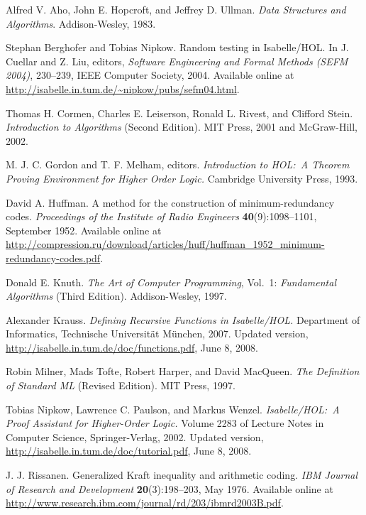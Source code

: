 \documentclass[11pt,a4paper]{article}
\begin{document}
\begin{thebibliography}{[9]}

 Alfred V. Aho, John E. Hopcroft, and Jeffrey D.
Ullman. \textsl{Data Structures and Algorithms}. Addison-Wesley, 1983.

 Stephan Berghofer and Tobias Nipkow.
Random testing in Isabelle/HOL. In J. Cuellar and Z. Liu, editors,
{\sl Software Engineering and Formal Methods (SEFM 2004)}, 230--239,
IEEE Computer Society, 2004. Available online at
\url{http://isabelle.in.tum.de/~nipkow/pubs/sefm04.html}.

 Thomas H. Cormen, Charles E. Leiserson,
Ronald L. Rivest, and Clifford Stein. {\sl Introduction to Algorithms\/}
(Second Edition). MIT Press, 2001 and McGraw-Hill, 2002.

 M. J. C. Gordon and T. F. Melham, editors.
{\sl Introduction to HOL:\ A Theorem Proving Environment for Higher Order
Logic.} Cambridge University Press, 1993.

 David A. Huffman. A method for the construction of
minimum-redundancy codes. {\sl Proceedings of the Institute of Radio Engineers}
{\bf 40}(9):1098--1101, September 1952. Available online at
\url{http://compression.ru/download/articles/huff/huffman_1952_minimum-redundancy-codes.pdf}.

 Donald E. Knuth. {\sl The Art of Computer Programming},
Vol.~1: {\sl Fundamental Algorithms\/} (Third Edition). Addison-Wesley, 1997.

 Alexander Krauss. {\sl Defining Recursive Functions in
Isabelle/HOL.} Department of Informatics, Technische Universit\"at M\"unchen,
2007. Updated version, \url{http://isabelle.in.tum.de/doc/functions.pdf},
June 8, 2008.

 Robin Milner, Mads Tofte, Robert Harper, and David
MacQueen. {\sl The Definition of Standard ML\/} (Revised Edition). MIT Press,
1997.

 Tobias Nipkow, Lawrence C. Paulson, and
Markus Wenzel. {\sl Is\-a\-belle/HOL:\ A Proof Assistant for
Higher-Order Logic.} Volume 2283 of Lecture Notes in Computer Science,
Springer-Verlag, 2002. Updated version,
\url{http://isabelle.in.tum.de/doc/tutorial.pdf}, June 8, 2008.

 J. J. Rissanen.
Generalized Kraft inequality and arithmetic coding. {\sl IBM
Journal of Research and Development\/} {\bf 20}(3):198--203, May 1976.
Available online at
\url{http://www.research.ibm.com/journal/rd/203/ibmrd2003B.pdf}.


\end{thebibliography}
\end{document}
